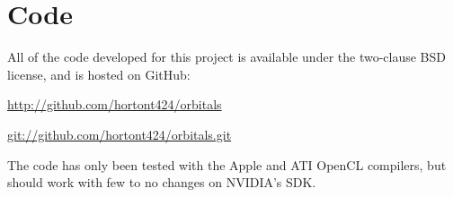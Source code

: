 \documentclass{acmsiggraph}
\begin{document}
\section{Code}

All of the code developed for this project is available under the two-clause BSD license, and is hosted on GitHub:

\url{http://github.com/hortont424/orbitals}

\url{git://github.com/hortont424/orbitals.git}

The code has only been tested with the Apple and ATI OpenCL compilers, but should work with few to no changes on NVIDIA's SDK.


\nocite{*}

\end{document}
